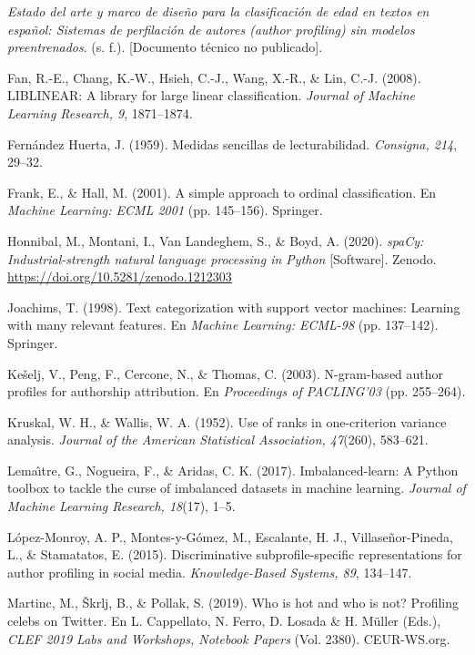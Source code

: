 \documentclass[10pt,twocolumn]{article}
\begin{document}
\begin{list}{}{\setlength{\leftmargin}{1.5em}\setlength{\itemindent}{-1.5em}\setlength{\itemsep}{2pt}\setlength{\parsep}{0pt}}
\item \textit{Estado del arte y marco de diseño para la clasificación de edad en textos en español: Sistemas de perfilación de autores (author profiling) sin modelos preentrenados}. (s. f.). [Documento técnico no publicado]. \textdaggerdbl{}
\item Fan, R.-E., Chang, K.-W., Hsieh, C.-J., Wang, X.-R., \& Lin, C.-J. (2008). LIBLINEAR: A library for large linear classification. \textit{Journal of Machine Learning Research, 9}, 1871–1874.
\item Fernández Huerta, J. (1959). Medidas sencillas de lecturabilidad. \textit{Consigna, 214}, 29–32.
\item Frank, E., \& Hall, M. (2001). A simple approach to ordinal classification. En \textit{Machine Learning: ECML 2001} (pp. 145–156). Springer.
\item Honnibal, M., Montani, I., Van Landeghem, S., \& Boyd, A. (2020). \textit{spaCy: Industrial-strength natural language processing in Python} [Software]. Zenodo. \url{https://doi.org/10.5281/zenodo.1212303}
\item Joachims, T. (1998). Text categorization with support vector machines: Learning with many relevant features. En \textit{Machine Learning: ECML-98} (pp. 137–142). Springer.
\item Kešelj, V., Peng, F., Cercone, N., \& Thomas, C. (2003). N-gram-based author profiles for authorship attribution. En \textit{Proceedings of PACLING’03} (pp. 255–264).
\item Kruskal, W. H., \& Wallis, W. A. (1952). Use of ranks in one-criterion variance analysis. \textit{Journal of the American Statistical Association, 47}(260), 583–621.
\item Lema\^{\i}tre, G., Nogueira, F., \& Aridas, C. K. (2017). Imbalanced-learn: A Python toolbox to tackle the curse of imbalanced datasets in machine learning. \textit{Journal of Machine Learning Research, 18}(17), 1–5. \textdagger{}
\item López-Monroy, A. P., Montes-y-Gómez, M., Escalante, H. J., Villaseñor-Pineda, L., \& Stamatatos, E. (2015). Discriminative subprofile-specific representations for author profiling in social media. \textit{Knowledge-Based Systems, 89}, 134–147.
\item Martinc, M., Škrlj, B., \& Pollak, S. (2019). Who is hot and who is not? Profiling celebs on Twitter. En L. Cappellato, N. Ferro, D. Losada \& H. Müller (Eds.), \textit{CLEF 2019 Labs and Workshops, Notebook Papers} (Vol. 2380). CEUR-WS.org. \textdagger{}

\end{list}
\end{document}
